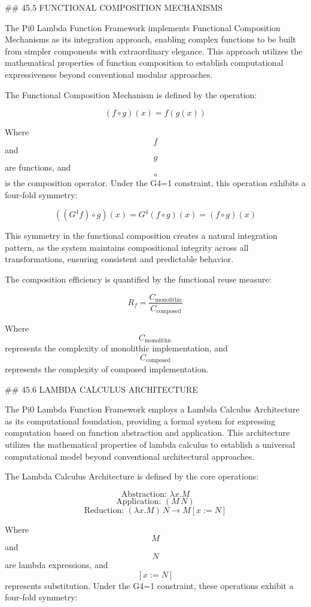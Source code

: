 ## 45.5 FUNCTIONAL COMPOSITION MECHANISMS

The Pi0 Lambda Function Framework implements Functional Composition Mechanisms as its integration approach, enabling complex functions to be built from simpler components with extraordinary elegance. This approach utilizes the mathematical properties of function composition to establish computational expressiveness beyond conventional modular approaches.

The Functional Composition Mechanism is defined by the operation:

$$ (f \circ g)(x) = f(g(x)) $$

Where $$ f $$ and $$ g $$ are functions, and $$ \circ $$ is the composition operator. Under the G4=1 constraint, this operation exhibits a four-fold symmetry:

$$ ((G^4 f) \circ g)(x) = G^4 (f \circ g)(x) = (f \circ g)(x) $$

This symmetry in the functional composition creates a natural integration pattern, as the system maintains compositional integrity across all transformations, ensuring consistent and predictable behavior.

The composition efficiency is quantified by the functional reuse measure:

$$ R_f = \frac{C_{\text{monolithic}}}{C_{\text{composed}}} $$

Where $$ C_{\text{monolithic}} $$ represents the complexity of monolithic implementation, and $$ C_{\text{composed}} $$ represents the complexity of composed implementation.

## 45.6 LAMBDA CALCULUS ARCHITECTURE

The Pi0 Lambda Function Framework employs a Lambda Calculus Architecture as its computational foundation, providing a formal system for expressing computation based on function abstraction and application. This architecture utilizes the mathematical properties of lambda calculus to establish a universal computational model beyond conventional architectural approaches.

The Lambda Calculus Architecture is defined by the core operations:

$$ \text{Abstraction: } \lambda x.M $$
$$ \text{Application: } (M \, N) $$
$$ \text{Reduction: } (\lambda x.M) \, N \to M[x := N] $$

Where $$ M $$ and $$ N $$ are lambda expressions, and $$ [x := N] $$ represents substitution. Under the G4=1 constraint, these operations exhibit a four-fold symmetry:

